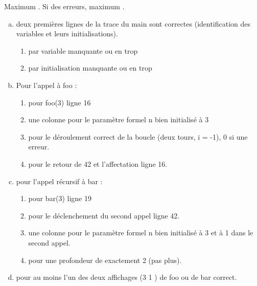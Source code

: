 \begin{correction}
\begin{table}
  \end{table}
\end{correction}

\begin{baremeenv}
 Maximum . Si des erreurs, maximum .
  \begin{enumerate}[(a)]
\item {} deux premières lignes de la trace du main sont correctes
  (identification des variables et leurs initialisations).
  \begin{enumerate}[$\ast$]
  \item {} par variable manquante ou en trop
  \item {} par initialisation manquante ou en trop
  \end{enumerate}
\item {} Pour l'appel à foo :
  \begin{enumerate}[$\ast$]
  \item {} pour foo(3) ligne 16 
\item {} une colonne pour le paramètre formel n bien
  initialisé à 3 
\item {} pour le déroulement correct de la boucle (deux tours, i
  = -1), 0 si une erreur.
\item {} pour le retour de 42 et l'affectation ligne 16.
 \end{enumerate}
\item {}  pour l'appel récursif à bar :
  \begin{enumerate}[$\ast$]
  \item {} pour bar(3) ligne 19 
\item {} pour le déclenchement du second appel ligne 42.
\item {} une colonne pour le paramètre formel n bien
  initialisé à 3 et à 1 dans le second appel.
  \item {} pour une profondeur de exactement 2 (pas plus). 
\end{enumerate}
\item {} pour au moins l'un des deux affichages (3 1
  \carriagereturn) de foo ou de bar correct. 
\end{enumerate}
\end{baremeenv}

